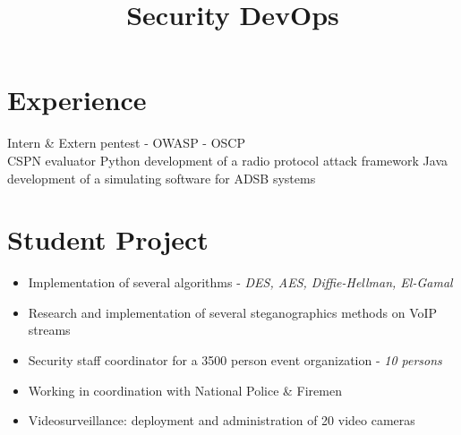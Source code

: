 \documentclass[11pt,a4paper,francais]{moderncv}
\title{Security DevOps}
\begin{document}
\maketitle
\vspace*{-3\baselineskip}

\section{Experience}
{Intern \& Extern pentest - OWASP - OSCP\\
CSPN evaluator}
{Python development of a radio protocol attack framework}
{Java development of a simulating software for ADSB systems}

\section{Student Project}
{
\begin{itemize}
 \item Implementation of several algorithms - \textit{DES, AES, Diffie-Hellman, El-Gamal}
 \item Research and implementation of several steganographics methods on VoIP streams
\end{itemize}
}
{
\begin{itemize}
  \item Security staff coordinator for a 3500 person event organization - \textit{10 persons}
  \item Working in coordination with National Police \& Firemen 
  \item Videosurveillance: deployment and administration of 20 video cameras
\end{itemize}
}
\end{document}
